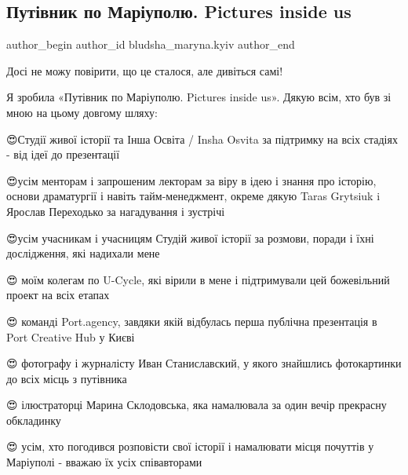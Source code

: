  
 
 
 
 

\subsection{Путівник по Маріуполю. Pictures inside us}
\label{sec:07_02_2020.fb.bludsha_maryna.kyiv.1.put_vnik_po_mar_upol}

\ifcmt
 author_begin
   author_id bludsha_maryna.kyiv
 author_end
\fi

Досі не можу повірити, що це сталося, але дивіться самі!

Я зробила «Путівник по Маріуполю. Pictures inside us». Дякую всім, хто був зі
мною на цьому довгому шляху:

😍Студії живої історії та Інша Освіта / Insha Osvita за підтримку на всіх
стадіях - від ідеї до презентації

😍усім менторам і запрошеним лекторам за віру в ідею і знання про історію,
основи драматургії і навіть тайм-менеджмент, окреме дякую Taras Grytsiuk i
Ярослав Переходько за нагадування і зустрічі

😍усім учасникам і учасницям Студій живої історії за розмови, поради і їхні
дослідження, які надихали мене

😍 моїм колегам по U-Cycle, які вірили в мене і підтримували цей божевільний
проект на всіх етапах

😍 команді Port.agency, завдяки якій відбулась перша публічна презентація в
Port Creative Hub у Києві

😍 фотографу і журналісту Иван Станиславский, у якого знайшлись фотокартинки до
всіх місць з путівника 

😍 ілюстраторці Марина Склодовська, яка намалювала за один вечір прекрасну
обкладинку

😍 усім, хто погодився розповісти свої історії і намалювати місця почуттів у
Маріуполі - вважаю їх усіх співавторами

